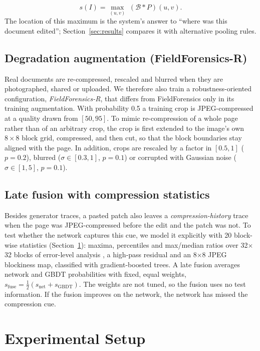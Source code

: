 \documentclass[conference]{IEEEtran}
\begin{document}
\begin{equation}
s(I) = \max_{(u,v)}\; (\mathcal{B} * P)(u,v).
\label{eq:score}
\end{equation}
The location of this maximum is the system's answer to ``where was this document edited''; Section~\ref{sec:results} compares it with alternative pooling rules.

\subsection{Degradation augmentation (FieldForensics-R)}
Real documents are re-compressed, rescaled and blurred when they are photographed, shared or uploaded. We therefore also train a robustness-oriented configuration, \emph{FieldForensics-R}, that differs from FieldForensics only in its training augmentation. With probability 0.5 a training crop is JPEG-compressed at a quality drawn from $[50,95]$. To mimic re-compression of a whole page rather than of an arbitrary crop, the crop is first extended to the image's own $8\times8$ block grid, compressed, and then cut, so that the block boundaries stay aligned with the page. In addition, crops are rescaled by a factor in $[0.5,1]$ ($p=0.2$), blurred ($\sigma\in[0.3,1]$, $p=0.1$) or corrupted with Gaussian noise ($\sigma\in[1,5]$, $p=0.1$).

\subsection{Late fusion with compression statistics}
Besides generator traces, a pasted patch also leaves a \emph{compression-history} trace when the page was JPEG-compressed before the edit and the patch was not. To test whether the network captures this cue, we model it explicitly with 20 block-wise statistics (Section~\ref{sec:setup}): maxima, percentiles and max/median ratios over 32$\times$32 blocks of error-level analysis \cite{ela}, a high-pass residual and an 8$\times$8 JPEG blockiness map, classified with gradient-boosted trees. A late fusion averages network and GBDT probabilities with fixed, equal weights, $s_{\mathrm{fuse}} = \frac{1}{2}(s_{\mathrm{net}} + s_{\mathrm{GBDT}})$. The weights are not tuned, so the fusion uses no test information. If the fusion improves on the network, the network has missed the compression cue.

\section{Experimental Setup}\label{sec:setup}
\end{document}
